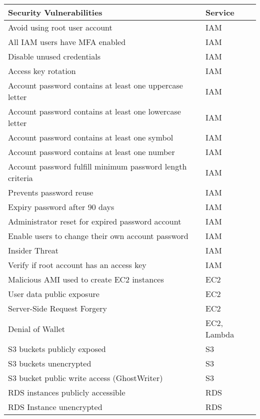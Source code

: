 \begin{longtable}{|p{10cm}|p{2.4cm}|}
    \hline
    \textbf{Security Vulnerabilities} & \textbf{Service} \\
    \hline
    Avoid using root user account & IAM \\
    \hline
    All IAM users have MFA enabled & IAM  \\
    \hline
    Disable unused credentials & IAM  \\
    \hline
    Access key rotation & IAM  \\
    \hline
    Account password contains at least one uppercase letter & IAM
    \\
    \hline
    Account password contains at least one lowercase letter &
    IAM  \\
    \hline
    Account password contains at least one symbol & IAM \\
    \hline
    Account password contains at least one number & IAM \\
    \hline
    Account password fulfill minimum password length criteria & IAM \\
    \hline
    Prevents password reuse & IAM \\
    \hline
    Expiry password after 90 days & IAM \\
    \hline
    Administrator reset for expired password account & IAM \\
    \hline
    Enable users to change their own account password & IAM \\
    \hline
    Insider Threat & IAM \\
    \hline
    Verify if root account has an access key & IAM \\
    \hline
    Malicious AMI used to create EC2 instances  & EC2 \\
    \hline
    User data public exposure & EC2 \\
    \hline
    Server-Side Request Forgery & EC2 \\
    \hline
    Denial of Wallet & EC2, Lambda \\
    \hline
    S3 buckets publicly exposed & S3 \\
    \hline
    S3 buckets unencrypted & S3 \\
    \hline
    S3 bucket public write access (GhostWriter) & S3  \\
    \hline
    RDS instances publicly accessible & RDS \\
    \hline
    RDS Instance unencrypted & RDS \\
    \hline

\end{longtable}
